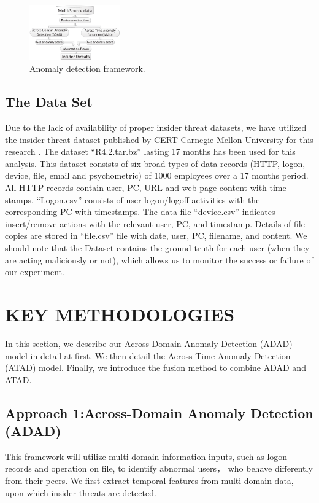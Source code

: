 \documentclass[conference]{IEEEtran}
\begin{document}
\begin{figure}[htb]
\centerline{\includegraphics[width = 0.35\textwidth]{figure/figure2.eps}}
\caption{Anomaly detection framework.}
\label{fig}
\end{figure}

\subsection{The Data Set}

Due to the lack of availability of proper insider threat datasets, we have utilized the insider threat dataset published by CERT Carnegie Mellon University for this research \cite{b17}. The dataset ``R4.2.tar.bz'' lasting 17 months has been used for this analysis. This dataset consists of six broad types of data records (HTTP, logon, device, file, email and psychometric) of 1000 employees over a 17 months period. All HTTP records contain user, PC, URL and web page content with time stamps. “Logon.csv” consists of user logon/logoff activities with the corresponding PC with timestamps. The data file “device.csv” indicates insert/remove actions with the relevant user, PC, and timestamp. Details of file copies are stored in “file.csv” file with date, user, PC, filename, and content. We should note that the Dataset contains the ground truth for each user (when they are acting maliciously or not), which allows us to monitor the success or failure of our experiment.

\section{KEY METHODOLOGIES}
In this section, we describe our Across-Domain Anomaly Detection (ADAD) model in detail at first. We then detail the Across-Time Anomaly Detection (ATAD) model. Finally, we introduce the fusion method to combine ADAD and ATAD.

\subsection{Approach 1:Across-Domain Anomaly Detection (ADAD)}\label{AA}
This framework will utilize multi-domain information inputs, such as logon records and operation on file, to identify abnormal users， who behave differently from their peers. We first extract temporal features from multi-domain data, upon which insider threats are detected.
\end{document}
